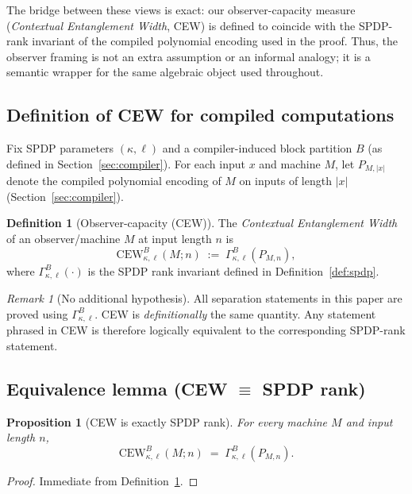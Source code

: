 \documentclass[12pt]{article}
\newtheorem{proposition}[theorem]{Proposition}
\theoremstyle{definition}
\newtheorem{definition}{Definition}
\theoremstyle{definition}
\theoremstyle{remark}
\newtheorem{remark}{Remark}
\theoremstyle{remark}
\begin{document}
The bridge between these views is exact: our observer-capacity measure
(\emph{Contextual Entanglement Width}, CEW) is defined to coincide with the
SPDP-rank invariant of the compiled polynomial encoding used in the proof.
Thus, the observer framing is not an extra assumption or an informal analogy;
it is a semantic wrapper for the same algebraic object used throughout.

\subsection{Definition of CEW for compiled computations}
\label{subsec:def-cew}

Fix SPDP parameters $(\kappa,\ell)$ and a compiler-induced block partition $B$
(as defined in Section~\ref{sec:compiler}).  For each input $x$ and
machine $M$, let $P_{M,|x|}$ denote the compiled polynomial encoding of
$M$ on inputs of length $|x|$ (Section~\ref{sec:compiler}).

\begin{definition}[Observer-capacity (CEW)]
\label{def:cew-observer}
The \emph{Contextual Entanglement Width} of an observer/machine $M$ at input
length $n$ is
\[
\mathrm{CEW}_{\kappa,\ell}^{B}(M;n) \;:=\; \Gamma^{B}_{\kappa,\ell}\!\left(P_{M,n}\right),
\]
where $\Gamma^{B}_{\kappa,\ell}(\cdot)$ is the SPDP rank invariant defined in
Definition~\ref{def:spdp}.
\end{definition}

\begin{remark}[No additional hypothesis]
\label{rem:no-extra-hypothesis}
All separation statements in this paper are proved using $\Gamma^{B}_{\kappa,\ell}$.
CEW is \emph{definitionally} the same quantity.  Any statement phrased in CEW
is therefore logically equivalent to the corresponding SPDP-rank statement.
\end{remark}

\subsection{Equivalence lemma (CEW $\equiv$ SPDP rank)}
\label{subsec:cew-equiv}

\begin{proposition}[CEW is exactly SPDP rank]
\label{prop:cew-is-spdp}
For every machine $M$ and input length $n$,
\[
\mathrm{CEW}_{\kappa,\ell}^{B}(M;n) \;=\; \Gamma^{B}_{\kappa,\ell}(P_{M,n}).
\]
\end{proposition}

\begin{proof}
Immediate from Definition~\ref{def:cew-observer}.
\end{proof}
\end{document}
